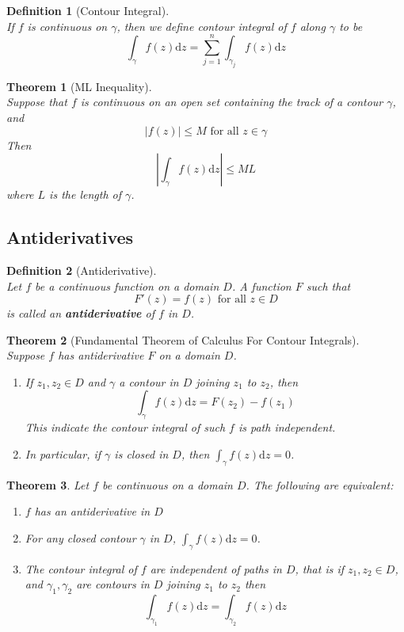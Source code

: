 \documentclass[12pt]{article}
\newcommand{\diff}{\mathrm{d}}
\newtheorem{definition}{Definition}[section]
\newtheorem{theorem}{Theorem}[section]
\theoremstyle{definition}
\begin{document}
\begin{definition}[Contour Integral]
\hfill\\\normalfont If $f$ is continuous on $\gamma$, then we define contour integral of $f$ along $\gamma$ to be
\[
\int_\gamma f(z)\diff z = \sum_{j=1}^n\int_{\gamma_j}f(z)\diff z
\]
\end{definition}
\begin{theorem}[ML Inequality]
\hfill\\\normalfont Suppose that $f$ is continuous on an open set containing the track of a contour $\gamma$, and
\[
|f(z)|\leq M \text{ for all }z\in \gamma
\]
Then 
\[
|\int_\gamma f(z)\diff z|\leq ML
\]
where $L$ is the length of $\gamma$.
\end{theorem}
\subsection{Antiderivatives}
\begin{definition}[Antiderivative]
\hfill\\\normalfont Let $f$ be a continuous function on a domain $D$. A function $F$ such that
\[
F'(z)=f(z)\text{ for all }z\in D
\]
is called an \textbf{antiderivative} of $f$ in $D$.
\end{definition}
\begin{theorem}[Fundamental Theorem of Calculus For Contour Integrals]
\hfill\\\normalfont Suppose $f$ has antiderivative $F$ on a domain $D$.
\begin{enumerate}
	\item If $z_1, z_2\in D$ and $\gamma$ a contour in $D$ joining $z_1$ to $z_2$, then
	\[
\int_\gamma f(z)\diff z = F(z_2)-f(z_1)
	\]
	This indicate the contour integral of such $f$ is path independent.
	\item In particular, if $\gamma$ is closed in $D$, then $\int_\gamma f(z)\diff z = 0$.
\end{enumerate}
\end{theorem}
\begin{theorem}Let $f$ be continuous on a domain $D$. The following are equivalent:
\begin{enumerate}
	\item $f$ has an antiderivative in $D$
	\item For any closed contour $\gamma$ in $D$, $\int_\gamma f(z)\diff z= 0$.
	\item The contour integral of $f$ are independent of paths in $D$, that is if $z_1, z_2\in D$, and $\gamma_1,\gamma_2$ are contours in $D$ joining $z_1$ to $z_2$ then
	\[
\int_{\gamma_1} f(z)\diff z = \int_{\gamma_2} f(z)\diff z
	\]
\end{enumerate}
\end{theorem}
\end{document}

